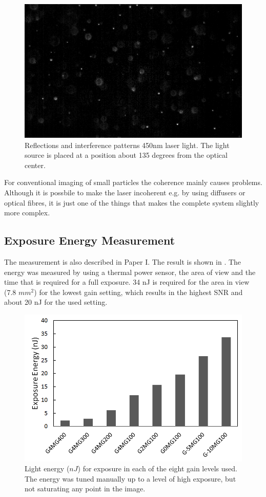 \begin{figure}%
\centering\includegraphics[width=0.6\linewidth]{figures/450nm45deg}
\caption{Reflections and interference patterns 450nm laser light. The light source is placed at a position about 135 degrees from the optical center.}
\label{fig:laser}
\end{figure}

For conventional imaging of small particles the coherence mainly causes problems. Although it is possbile to make the laser incoherent e.g. by using diffusers or optical fibres, it is just one of the things that makes the complete system slightly more complex.

\subsection{Exposure Energy Measurement}
\label{sec:expmeasurement}

The measurement is also described in Paper I. The result is shown in . The energy was measured by using a thermal power sensor, the area of view and the time that is required for a full exposure. 34 nJ is required for the area in view (7.8 $mm^2$) for the lowest gain setting, which results in the highest SNR and about 20 nJ for the used setting.

\begin{figure}[ht]
\centering\includegraphics[width=0.75\linewidth]{figures/Energy_per_gain_level2}
\caption{Light energy ($nJ$) for exposure in each of the eight gain levels used. The energy was tuned manually up to a level of high exposure, but not saturating any point in the image.}
\label{fig:expenergy}
\end{figure}

